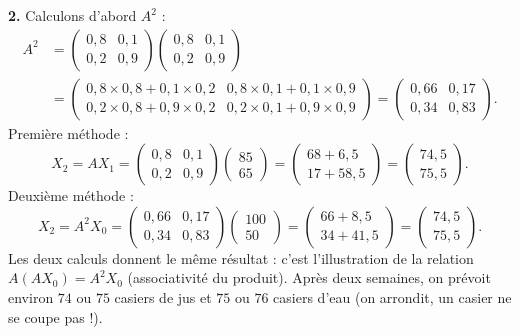 \documentclass[11pt]{article}
\begin{document}
\begin{exoresolu}
\textbf{2.} Calculons d'abord $A^2$ :
\begin{align*}
A^2 &= \begin{pmatrix} 0,8 & 0,1 \\ 0,2 & 0,9 \end{pmatrix} \begin{pmatrix} 0,8 & 0,1 \\ 0,2 & 0,9 \end{pmatrix} \\
&= \begin{pmatrix} 0,8 \times 0,8 + 0,1 \times 0,2 & 0,8 \times 0,1 + 0,1 \times 0,9 \\ 0,2 \times 0,8 + 0,9 \times 0,2 & 0,2 \times 0,1 + 0,9 \times 0,9 \end{pmatrix}
= \begin{pmatrix} 0,66 & 0,17 \\ 0,34 & 0,83 \end{pmatrix}.
\end{align*}
Première méthode :
\[
X_2 = A X_1 = \begin{pmatrix} 0,8 & 0,1 \\ 0,2 & 0,9 \end{pmatrix} \begin{pmatrix} 85 \\ 65 \end{pmatrix}
= \begin{pmatrix} 68 + 6,5 \\ 17 + 58,5 \end{pmatrix} = \begin{pmatrix} 74,5 \\ 75,5 \end{pmatrix}.
\]
Deuxième méthode :
\[
X_2 = A^2 X_0 = \begin{pmatrix} 0,66 & 0,17 \\ 0,34 & 0,83 \end{pmatrix} \begin{pmatrix} 100 \\ 50 \end{pmatrix}
= \begin{pmatrix} 66 + 8,5 \\ 34 + 41,5 \end{pmatrix} = \begin{pmatrix} 74,5 \\ 75,5 \end{pmatrix}.
\]
Les deux calculs donnent le même résultat : c'est l'illustration de la relation $A(AX_0) = A^2 X_0$ (associativité du produit). Après deux semaines, on prévoit environ $74$ ou $75$ casiers de jus et $75$ ou $76$ casiers d'eau (on arrondit, un casier ne se coupe pas !).


\end{exoresolu}
\end{document}
